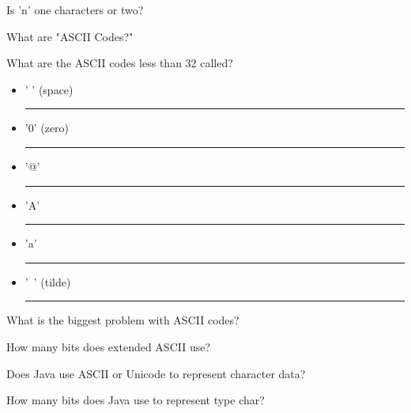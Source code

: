 \documentclass[letterpaper,12pt]{exam}
\begin{document}
\begin{questions}
\begin{samepage}
	\question Is 'n' one characters or two?
	\vspace{5mm}
\end{samepage}

\begin{samepage}
	\question What are "ASCII Codes?"
	\vspace{5mm}
\end{samepage}
\begin{samepage}
	\question What are the ASCII codes less than 32 called?
	\vspace{5mm}
\end{samepage}
\begin{samepage}
	\question 
	  \begin{itemize}
		\item ' ' (space) \rule{20mm}{0.15mm}
		\vspace{5mm}
		\item '0' (zero) \rule{20mm}{0.15mm}
		\vspace{5mm}
		\item '@' \rule{20mm}{0.15mm}
		\vspace{5mm}
		\item 'A' \rule{20mm}{0.15mm} 
		\vspace{5mm}
		\item 'a' \rule{20mm}{0.15mm}
		\vspace{5mm}
		\item '~' (tilde) \rule{20mm}{0.15mm}
		\vspace{5mm}
	   \end{itemize}
\end{samepage}
\begin{samepage}
	\question What is the biggest problem with ASCII codes?
	\vspace{15mm}
\end{samepage}
\begin{samepage}
	\question How many bits does extended ASCII use?
	\vspace{5mm}
\end{samepage}


\begin{samepage}
	\question Does Java use ASCII or Unicode to represent character data?
	\vspace{5mm}
\end{samepage}

\begin{samepage}
	\question How many bits does Java use to represent type char?
	\vspace{5mm}
\end{samepage}


\end{questions}
\end{document}
